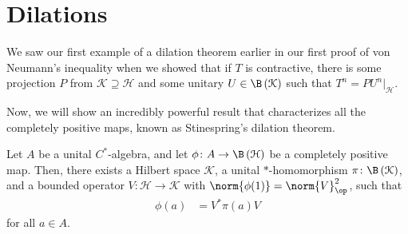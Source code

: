 \documentclass[10pt]{mypackage}
\begin{document}
\section{Dilations}%
We saw our first example of a dilation theorem earlier in our first proof of von Neumann's inequality when we showed that if $T$ is contractive, there is some projection $P$ from $\mathcal{K}\supseteq \mathcal{H}$ and some unitary $U\in \B\left( \mathcal{K} \right)$ such that $T^n = PU^n|_{\mathcal{H}}$.\newline

Now, we will show an incredibly powerful result that characterizes all the completely positive maps, known as Stinespring's dilation theorem.
\begin{theorem}
  Let $A$ be a unital $C^{\ast}$-algebra, and let $\phi\colon A\rightarrow \B\left( \mathcal{H} \right)$ be a completely positive map. Then, there exists a Hilbert space $\mathcal{K}$, a unital $\ast$-homomorphism $\pi\colon \B\left( \mathcal{K} \right)$, and a bounded operator $V\colon \mathcal{H}\rightarrow \mathcal{K}$ with $\norm{\phi(1)} = \norm{V}^2_{\op}$, such that
  \begin{align*}
    \phi(a) &= V^{\ast}\pi(a)V
  \end{align*}
  for all $a\in A$.
\end{theorem}
\end{document}
